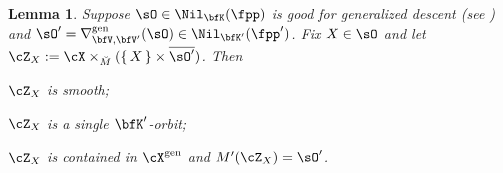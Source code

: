 \documentclass[12pt,a4paper]{amsart}
\def\gDD{\nabla^{\mathrm{gen}}}
\numberwithin{equation}{section}
\newtheorem{lem}[thm]{Lemma}
\theoremstyle{remark}
\def\Xg{\cX^{\mathrm{gen}}}
\def\ZX{\cZ_{X}}
\def\bsOp{\overline{\sO'}}
\begin{document}

\begin{lem}\label{lem:GDS.sh}
  Suppose $\sO\in \Nil_{\bfK}(\fpp)$ is good for generalized descent
  (see ) and
  $\sO' = \gDD_{\bfV,\bfV'}(\sO)\in \Nil_{\bfK'}(\fpp')$. Fix $X\in \sO$ and
  let $\ZX := \cX\times_{\dbM}(\set{X}\times\bsOp)$. Then
\begin{enumT}
\item\label{it:GDS.sh.2} $\ZX$ is smooth;
\item\label{it:GDS.sh.1} $\ZX$ is a single $\bfK'$-orbit;
\item\label{it:GDS.sh.3} $\ZX$ is contained in $\Xg$ and  $M'(\ZX) = \sO'$.

\end{enumT}
\end{lem}
\end{document}
